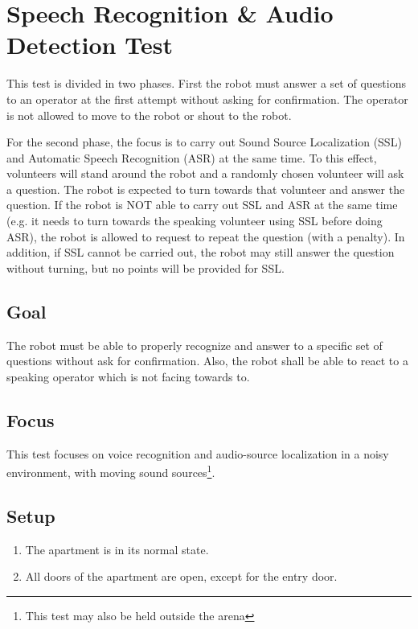 \section{Speech Recognition \& Audio Detection Test}

This test is divided in two phases. First the robot must answer a set of questions to an operator at the first attempt without asking for confirmation. The operator is not allowed to move to the robot or shout to the robot.

For the second phase, the focus is to carry out Sound Source Localization (SSL) and Automatic Speech Recognition (ASR) at the same time. To this effect, volunteers will stand around the robot and a randomly chosen volunteer will ask a question. The robot is expected to turn towards that volunteer and answer the question. If the robot is NOT able to carry out SSL and ASR at the same time (e.g. it needs to turn towards the speaking volunteer using SSL before doing ASR), the robot is allowed to request to repeat the question (with a penalty). In addition, if SSL cannot be carried out, the robot may still answer the question without turning, but no points will be provided for SSL.

\subsection{Goal}
The robot must be able to properly recognize and answer to a specific set of questions without ask for confirmation. Also, the robot shall be able to react to a speaking operator which is not facing towards to.

\subsection{Focus}

This test focuses on voice recognition and audio-source localization in a noisy environment, with moving sound sources\footnote{This test may also be held outside the arena}.

\subsection{Setup}
\begin{enumerate}
\item The apartment is in its normal state.
\item All doors of the apartment are open, except for the entry door. 
\end{enumerate}

